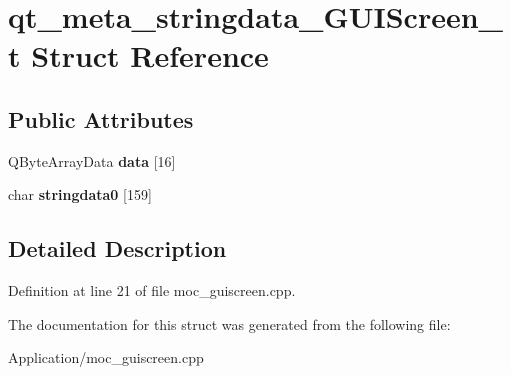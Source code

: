 \hypertarget{structqt__meta__stringdata___g_u_i_screen__t}{}\section{qt\+\_\+meta\+\_\+stringdata\+\_\+\+G\+U\+I\+Screen\+\_\+t Struct Reference}
\label{structqt__meta__stringdata___g_u_i_screen__t}
\subsection*{Public Attributes}
\begin{DoxyCompactItemize}
\item 
\mbox{\label{structqt__meta__stringdata___g_u_i_screen__t_a3c1f0fede771605a773c27abf1d85026}} 
Q\+Byte\+Array\+Data {\bfseries data} \mbox{[}16\mbox{]}
\item 
\mbox{\label{structqt__meta__stringdata___g_u_i_screen__t_ad27f22982a0edf30ad2b3f4c81f740d4}} 
char {\bfseries stringdata0} \mbox{[}159\mbox{]}
\end{DoxyCompactItemize}


\subsection{Detailed Description}


Definition at line 21 of file moc\+\_\+guiscreen.\+cpp.



The documentation for this struct was generated from the following file\+:\begin{DoxyCompactItemize}
\item 
Application/moc\+\_\+guiscreen.\+cpp\end{DoxyCompactItemize}
